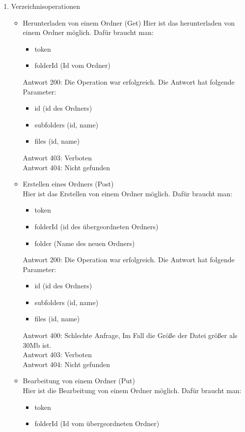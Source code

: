 \documentclass[a4paper,twoside]{article}
\begin{document}
\begin{enumerate}
		\item Verzeichnisoperationen
		\begin{itemize}
			\item Herunterladen von einem Ordner (Get)
			Hier ist das herunterladen von einem Ordner m\"oglich. Daf\"ur braucht man: 
			\begin{itemize}
				\item token
				\item folderId (Id vom Ordner) 
			\end{itemize}
			Antwort 200: Die Operation war erfolgreich. Die Antwort hat folgende Parameter:
			\begin{itemize}
				\item id (id des Ordners)
				\item subfolders (id, name)
				\item files (id, name)
			\end{itemize}
			Antwort 403: Verboten \\
			Antwort 404: Nicht gefunden
			\item Erstellen eines Ordners (Post) \\
			Hier ist das Erstellen von einem Ordner m\"oglich. Daf\"ur braucht man:
			\begin{itemize}
				\item token
				\item folderId (id des \"ubergeordneten Ordners)
				\item folder (Name des neuen Ordners)
			\end{itemize}
			Antwort 200: Die Operation war erfolgreich. Die Antwort hat folgende Parameter:
			\begin{itemize}
				\item id (id des Ordners)
				\item subfolders (id, name)
				\item files (id, name)
			\end{itemize}
			Antwort 400: Schlechte Anfrage, Im Fall die Gr\"o{\ss}e der Datei gr\"o{\ss}er als 30Mb ist. \\
			Antwort 403: Verboten \\
			Antwort 404: Nicht gefunden
			\item Bearbeitung von einem Ordner (Put) \\
			Hier ist die Bearbeitung von einem Ordner m\"oglich. Daf\"ur braucht man: 
			\begin{itemize}
				\item token
				\item folderId (Id vom \"ubergeordneten Ordner) 

\end{itemize}
\end{itemize}
\end{enumerate}
\end{document}
